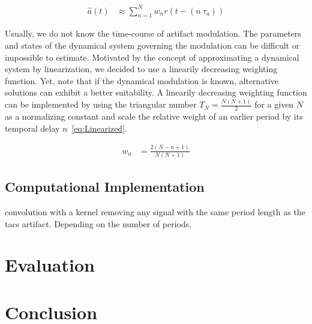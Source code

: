 \documentclass[a4paper]{article}
\begin{document}
\begin{align}
    \hat{a}(t) & \approx \sum_{n=1}^{N} w_n r(t - (n~\tau_a))\label{eq:Weighted}
\end{align}

Usually, we do not know the time-course of artifact modulation. The parameters and states of the dynamical system governing the modulation can be difficult or impossible to estimate.
Motivated by the concept of approximating a dynamical system by linearization, we decided to use a linearily decreasing weighting function. Yet, note that if the dynamical modulation is known, alternative solutions can exhibit a better suitability.
A linearily decreasing weighting function can be implemented by using the triangular number $T_N = \frac{N(N+1)}{2}$ for a given $N$ as a normalizing constant and scale the relative weight of an earlier period by its temporal delay $n$~\eqref{eq:Linearized}.

\begin{align}
    w_n & = \frac{2(N-n+1)}{N(N+1)}\label{eq:Linearized}
\end{align}

\subsection{Computational Implementation}

convolution with a kernel removing any signal with the same period length as the \gls{tacs} artifact. Depending on the number of periods,

\section{Evaluation}

\section{Conclusion}




\end{document}

